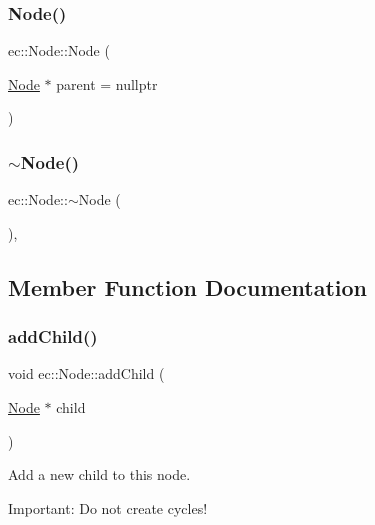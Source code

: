 \subsubsection{\texorpdfstring{Node()}{Node()}}
{\footnotesize\ttfamily ec\+::\+Node\+::\+Node (\begin{DoxyParamCaption}\item[{\mbox{\hyperlink{classec_1_1_node}{Node}} $\ast$}]{parent = {\ttfamily nullptr} }\end{DoxyParamCaption})\hspace{0.3cm}{\ttfamily [explicit]}}

\mbox{\label{classec_1_1_node_a6b2dfa6d2490ec46a5d15a326780889b}} 
\subsubsection{\texorpdfstring{$\sim$\+Node()}{~Node()}}
{\footnotesize\ttfamily ec\+::\+Node\+::$\sim$\+Node (\begin{DoxyParamCaption}{ }\end{DoxyParamCaption})\hspace{0.3cm}{\ttfamily [virtual]}, {\ttfamily [default]}}



\subsection{Member Function Documentation}
\mbox{\label{classec_1_1_node_a647bcdef4e01de3ecb34e0917ba9e333}} 
\subsubsection{\texorpdfstring{add\+Child()}{addChild()}}
{\footnotesize\ttfamily void ec\+::\+Node\+::add\+Child (\begin{DoxyParamCaption}\item[{\mbox{\hyperlink{classec_1_1_node}{Node}} $\ast$}]{child }\end{DoxyParamCaption})}



Add a new child to this node. 

Important\+: Do not create cycles! \mbox{\label{classec_1_1_node_aef615bcf1c24225838e00c15d03dc707}} 

